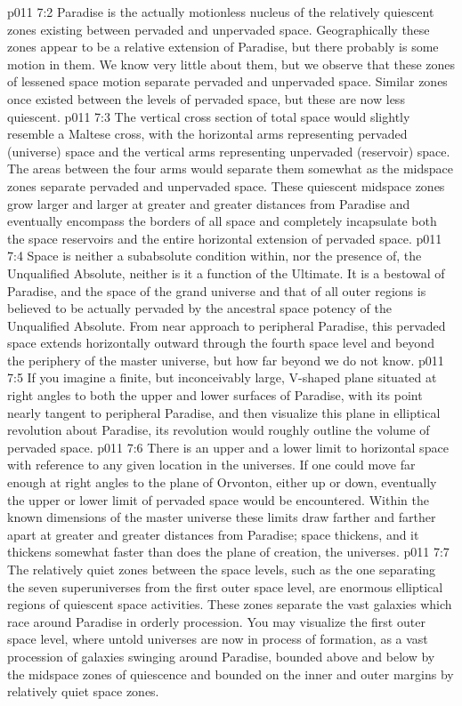 \vs p011 7:2 Paradise is the actually motionless nucleus of the relatively quiescent zones existing between pervaded and unpervaded space. Geographically these zones appear to be a relative extension of Paradise, but there probably is some motion in them. We know very little about them, but we observe that these zones of lessened space motion separate pervaded and unpervaded space. Similar zones once existed between the levels of pervaded space, but these are now less quiescent.
\vs p011 7:3 The vertical cross section of total space would slightly resemble a Maltese cross, with the horizontal arms representing pervaded (universe) space and the vertical arms representing unpervaded (reservoir) space. The areas between the four arms would separate them somewhat as the midspace zones separate pervaded and unpervaded space. These quiescent midspace zones grow larger and larger at greater and greater distances from Paradise and eventually encompass the borders of all space and completely incapsulate both the space reservoirs and the entire horizontal extension of pervaded space.
\vs p011 7:4 \pc Space is neither a subabsolute condition within, nor the presence of, the Unqualified Absolute, neither is it a function of the Ultimate. It is a bestowal of Paradise, and the space of the grand universe and that of all outer regions is believed to be actually pervaded by the ancestral space potency of the Unqualified Absolute. From near approach to peripheral Paradise, this pervaded space extends horizontally outward through the fourth space level and beyond the periphery of the master universe, but how far beyond we do not know.
\vs p011 7:5 If you imagine a finite, but inconceivably large, V\hyp{}shaped plane situated at right angles to both the upper and lower surfaces of Paradise, with its point nearly tangent to peripheral Paradise, and then visualize this plane in elliptical revolution about Paradise, its revolution would roughly outline the volume of pervaded space.
\vs p011 7:6 There is an upper and a lower limit to horizontal space with reference to any given location in the universes. If one could move far enough at right angles to the plane of Orvonton, either up or down, eventually the upper or lower limit of pervaded space would be encountered. Within the known dimensions of the master universe these limits draw farther and farther apart at greater and greater distances from Paradise; space thickens, and it thickens somewhat faster than does the plane of creation, the universes.
\vs p011 7:7 \pc The relatively quiet zones between the space levels, such as the one separating the seven superuniverses from the first outer space level, are enormous elliptical regions of quiescent space activities. These zones separate the vast galaxies which race around Paradise in orderly procession. You may visualize the first outer space level, where untold universes are now in process of formation, as a vast procession of galaxies swinging around Paradise, bounded above and below by the midspace zones of quiescence and bounded on the inner and outer margins by relatively quiet space zones.
